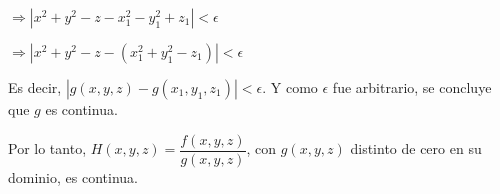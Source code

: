\documentclass[fleqn]{article}
\begin{document}
\begin{enumerate}
        $ \Longrightarrow \left\lvert x^2 + y^2 - z - x_1^2 - y_1^2 + z_1  \right\rvert < \epsilon $

        $ \Longrightarrow \left\lvert x^2 + y^2 - z - (x_1^2 + y_1^2 - z_1)  \right\rvert < \epsilon $

        Es decir, $ \left\lvert g(x,y,z) - g(x_1,y_1,z_1) \right\rvert < \epsilon $. Y como $ \epsilon $ fue arbitrario, se concluye que $ g $ es continua.

        Por lo tanto, $ H(x,y,z) = \dfrac{f(x,y,z)}{g(x,y,z)} $, con $ g(x,y,z) $ distinto de cero en su dominio, es continua.
        
    \end{enumerate}
\end{document}
